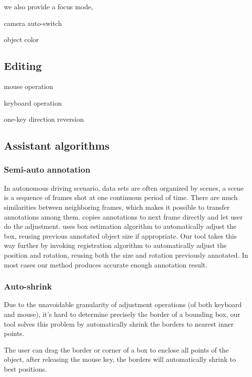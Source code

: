 \documentclass[letterpaper, 10 pt, conference]{ieeeconf}  %
\begin{document}
we also provide a focus mode, 

camera auto-switch

object color

\subsection{Editing}
mouse operation

keyboard operation

one-key direction reversion


\subsection{Assistant algorithms}

\subsubsection{Semi-auto annotation}

In autonomous driving scenario, data sets are often organized by scenes\cite{Caesar2019nuScenesAM,Patil2019TheHD,lyft2019}, a scene is a sequence of frames shot at one continuous period of time. There are much similarities between neighboring frames, which makes it possible to transfer annotations among them. \cite{Zimmer20193DBA} copies annotations to next frame directly and let user do the adjustment.\cite{Wang2019LATTEAL} uses box estimation algorithm to automatically adjust the box, reusing previous annotated object size if appropriate. Our tool takes this way further by invoking registration algorithm \cite{Yang2016GoICPAG} to automatically adjust the position and rotation, reusing both the size and rotation previously annotated. In most cases our method produces  accurate enough annotation result.


\subsubsection{Auto-shrink}

Due to the unavoidable granularity of adjustment operations (of both keyboard and mouse), it's hard to determine precisely the border of a bounding box, our tool solves this problem by automatically shrink the borders to nearest inner points. 

The user can drag the border or corner of a box to enclose all points of the object, after releasing the mouse key, the borders will automatically shrink to best positions.
\end{document}
